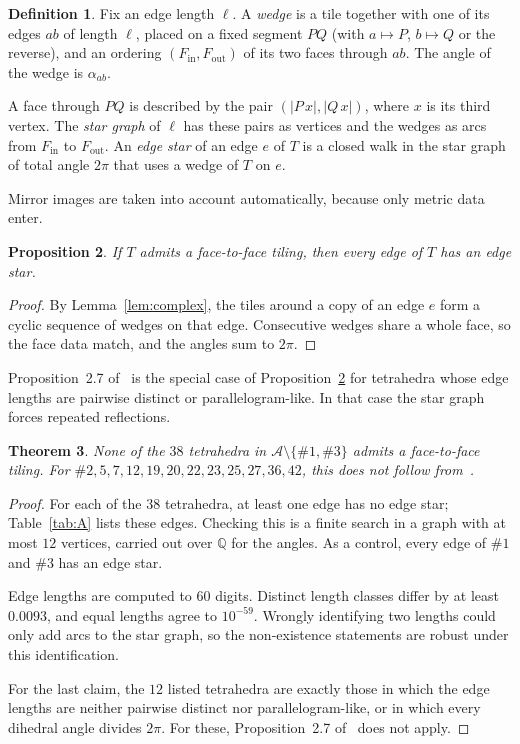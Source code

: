 \documentclass[11pt]{amsart}
\newtheorem{theorem}{Theorem}
\newtheorem{proposition}[theorem]{Proposition}
\theoremstyle{definition}
\newtheorem{definition}[theorem]{Definition}
\newcommand{\cA}{\mathscr{A}}
\newcommand{\Q}{\mathbb{Q}}
\begin{document}
\begin{definition}
Fix an edge length $\ell$. A \emph{wedge} is a tile together with one of its edges $ab$ of length $\ell$, placed on a fixed
segment $PQ$ (with $a\mapsto P$, $b\mapsto Q$ or the reverse), and an ordering $(F_{\mathrm{in}},F_{\mathrm{out}})$ of its
two faces through $ab$. The angle of the wedge is $\alpha_{ab}$.

A face through $PQ$ is described by the pair $(|P\,x|,|Q\,x|)$, where $x$ is its third vertex. The \emph{star graph} of
$\ell$ has these pairs as vertices and the wedges as arcs from $F_{\mathrm{in}}$ to $F_{\mathrm{out}}$. An \emph{edge
star} of an edge $e$ of $T$ is a closed walk in the star graph of total angle $2\pi$ that uses a wedge of $T$ on $e$.
\end{definition}

Mirror images are taken into account automatically, because only metric data enter.

\begin{proposition}\label{prop:star}
If $T$ admits a face-to-face tiling, then every edge of $T$ has an edge star.
\end{proposition}
\begin{proof}
By Lemma~\ref{lem:complex}, the tiles around a copy of an edge $e$ form a cyclic sequence of wedges on that edge.
Consecutive wedges share a whole face, so the face data match, and the angles sum to $2\pi$.
\end{proof}

Proposition~2.7 of~\cite{CS} is the special case of Proposition~\ref{prop:star} for tetrahedra whose edge lengths are
pairwise distinct or parallelogram-like. In that case the star graph forces repeated reflections.

\begin{theorem}\label{thm:nof2f}
None of the $38$ tetrahedra in $\cA\setminus\{\#1,\#3\}$ admits a face-to-face tiling. For
$\#2,5,7,12,19,20,22,23,25,27,36,42$, this does not follow from~\cite[Prop.~2.7]{CS}.
\end{theorem}
\begin{proof}
For each of the $38$ tetrahedra, at least one edge has no edge star; Table~\ref{tab:A} lists these edges. Checking this
is a finite search in a graph with at most $12$ vertices, carried out over $\Q$ for the angles. As a control, every edge
of $\#1$ and $\#3$ has an edge star.

Edge lengths are computed to $60$ digits. Distinct length classes differ by at least $0.0093$, and equal lengths agree to
$10^{-59}$. Wrongly identifying two lengths could only add arcs to the star graph, so the non-existence statements are
robust under this identification.

For the last claim, the $12$ listed tetrahedra are exactly those in which the edge lengths are neither pairwise distinct
nor parallelogram-like, or in which every dihedral angle divides $2\pi$. For these, Proposition~2.7 of~\cite{CS} does
not apply.
\end{proof}
\end{document}
